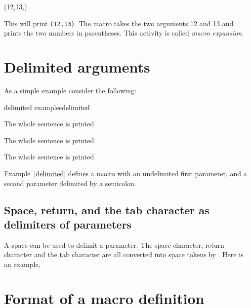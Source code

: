 \begin{teX}
\def\twonumbers#1#2{(#1,#2)} 
\twonumbers{12,13}
\bye
\end{teX}
\def\twonumbers#1#2{(#1,#2)}
This will print \texttt{\twonumbers{12}{13}}. The macro takes the two arguments 12 and 13  and prints the two numbers in parentheses. This activity is called \textit{macro expansion}.

 
\section{Delimited arguments}

As a simple example consider the following:

\begin{teX}
\def\asentence#1#2;{{#1#2}}
\bye
\end{teX}

\begin{texexample}{delimited examples}{delimited}
\def\asentence#1#2;{{#1#2}}

{\asentence The whole sentence is printed;}\par
{\asentence The whole sentence is printed;}\par
{\asentence The whole sentence is printed;}\par
\end{texexample}


Example~\ref{delimited} defines a macro with an undelimited first parameter, and a second parameter delimited by a
semicolon.

\subsection{Space, return, and the tab character as delimiters of parameters}

A space can be used to delimit a parameter. The space character, return character and the tab character are all converted into space tokens by \tex. Here is an example,



\section{Format of a macro definition}

